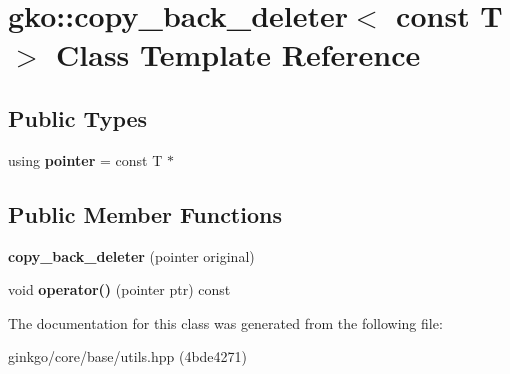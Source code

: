\hypertarget{classgko_1_1copy__back__deleter_3_01const_01T_01_4}{}\section{gko\+:\+:copy\+\_\+back\+\_\+deleter$<$ const T $>$ Class Template Reference}
\label{classgko_1_1copy__back__deleter_3_01const_01T_01_4}
\subsection*{Public Types}
\begin{DoxyCompactItemize}
\item 
\mbox{\label{classgko_1_1copy__back__deleter_3_01const_01T_01_4_ac97aced5ec2b913d1b2ed864852c7e7a}} 
using {\bfseries pointer} = const T $\ast$
\end{DoxyCompactItemize}
\subsection*{Public Member Functions}
\begin{DoxyCompactItemize}
\item 
\mbox{\label{classgko_1_1copy__back__deleter_3_01const_01T_01_4_a5df23aa81eb300213916238b9bf93507}} 
{\bfseries copy\+\_\+back\+\_\+deleter} (pointer original)
\item 
\mbox{\label{classgko_1_1copy__back__deleter_3_01const_01T_01_4_a040c2d22121f60c491e3b6e65f399248}} 
void {\bfseries operator()} (pointer ptr) const
\end{DoxyCompactItemize}


The documentation for this class was generated from the following file\+:\begin{DoxyCompactItemize}
\item 
ginkgo/core/base/utils.\+hpp (4bde4271)\end{DoxyCompactItemize}
